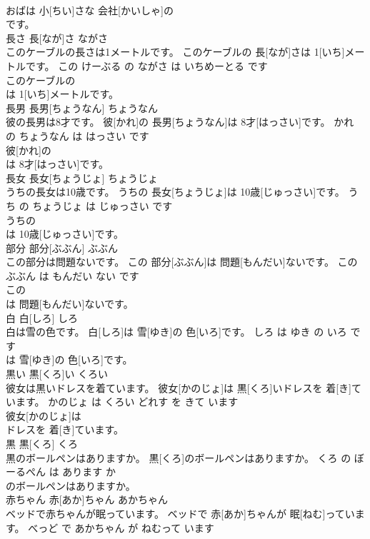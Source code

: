 \documentclass[8pt]{extreport}
\begin{document}
\begin{CJK}{UTF8}{min}
\\	おばは 小[ちい]さな 会社[かいしゃ]の
\\	です。			
\\	長さ	長[なが]さ	ながさ	
\\	このケーブルの長さは1メートルです。	このケーブルの 長[なが]さは 1[いち]メートルです。	この けーぶる の ながさ は いちめーとる です	
\\	このケーブルの
\\	は 1[いち]メートルです。			
\\	長男	長男[ちょうなん]	ちょうなん	
\\	彼の長男は8才です。	彼[かれ]の 長男[ちょうなん]は 8才[はっさい]です。	かれ の ちょうなん は はっさい です	
\\	彼[かれ]の
\\	は 8才[はっさい]です。			
\\	長女	長女[ちょうじょ]	ちょうじょ	
\\	うちの長女は10歳です。	うちの 長女[ちょうじょ]は 10歳[じゅっさい]です。	うち の ちょうじょ は じゅっさい です	
\\	うちの
\\	は 10歳[じゅっさい]です。			
\\	部分	部分[ぶぶん]	ぶぶん	
\\	この部分は問題ないです。	この 部分[ぶぶん]は 問題[もんだい]ないです。	この ぶぶん は もんだい ない です	
\\	この
\\	は 問題[もんだい]ないです。			
\\	白	白[しろ]	しろ	
\\	白は雪の色です。	白[しろ]は 雪[ゆき]の 色[いろ]です。	しろ は ゆき の いろ です	
\\	は 雪[ゆき]の 色[いろ]です。			
\\	黒い	黒[くろ]い	くろい	
\\	彼女は黒いドレスを着ています。	彼女[かのじょ]は 黒[くろ]いドレスを 着[き]ています。	かのじょ は くろい どれす を きて います	
\\	彼女[かのじょ]は
\\	ドレスを 着[き]ています。			
\\	黒	黒[くろ]	くろ	
\\	黒のボールペンはありますか。	黒[くろ]のボールペンはありますか。	くろ の ぼーるぺん は あります か	
\\	のボールペンはありますか。			
\\	赤ちゃん	赤[あか]ちゃん	あかちゃん	
\\	ベッドで赤ちゃんが眠っています。	ベッドで 赤[あか]ちゃんが 眠[ねむ]っています。	べっど で あかちゃん が ねむって います	

\end{CJK}
\end{document}
